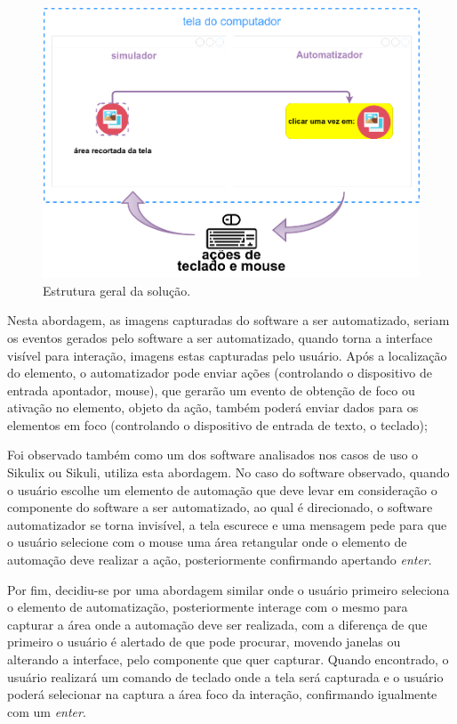 \documentclass[tg]{mdtufsm}
\begin{document}
                \begin{figure}[!htb]
                    {\centering
                    \includegraphics[width=1.0\textwidth]{imagens/actionRecord}
                    \caption{Estrutura geral da solução.}
                    \label{fig:actionRecord}}
                \end{figure}

                Nesta abordagem, as imagens capturadas do software a ser automatizado, seriam os eventos gerados pelo software a ser automatizado, quando torna a interface visível para interação, imagens estas capturadas pelo usuário. Após a localização do elemento, o automatizador pode enviar ações (controlando o dispositivo de entrada apontador, mouse), que gerarão um evento de obtenção de foco ou ativação no elemento, objeto da ação, também poderá enviar dados para os elementos em foco (controlando o dispositivo de entrada de texto, o teclado);

                Foi observado também como um dos software analisados nos casos de uso o Sikulix ou Sikuli, utiliza esta abordagem. No caso do software observado, quando o usuário escolhe um elemento de automação que deve levar em consideração o componente do software a ser automatizado, ao qual é direcionado, o software automatizador se torna invisível, a tela escurece e uma mensagem pede para que o usuário selecione com o mouse uma área retangular onde o elemento de automação deve realizar a ação, posteriormente confirmando apertando \emph{enter}.

                Por fim, decidiu-se por uma abordagem similar onde o usuário primeiro seleciona o elemento de automatização, posteriormente interage com o mesmo para capturar a área onde a automação deve ser realizada, com a diferença de que primeiro o usuário é alertado de que pode procurar, movendo janelas ou alterando a interface, pelo componente que quer capturar. Quando encontrado, o usuário realizará um comando de teclado onde a tela será capturada e o usuário poderá selecionar na captura a área foco da interação, confirmando igualmente com um \emph{enter}.
\end{document}
